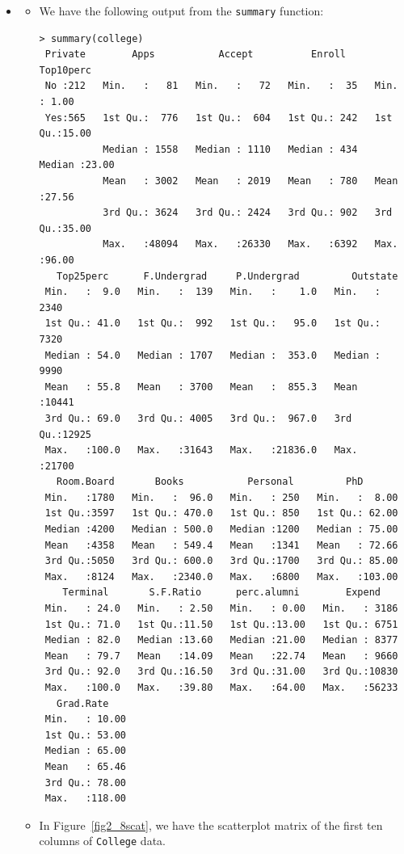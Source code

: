 \begin{itemize}
    \item[(c)]
        \begin{itemize}
            \item[i.] We have the following output from the \verb|summary| function:
                \begin{lstlisting}
> summary(college)
 Private        Apps           Accept          Enroll       Top10perc
 No :212   Min.   :   81   Min.   :   72   Min.   :  35   Min.   : 1.00
 Yes:565   1st Qu.:  776   1st Qu.:  604   1st Qu.: 242   1st Qu.:15.00
           Median : 1558   Median : 1110   Median : 434   Median :23.00
           Mean   : 3002   Mean   : 2019   Mean   : 780   Mean   :27.56
           3rd Qu.: 3624   3rd Qu.: 2424   3rd Qu.: 902   3rd Qu.:35.00
           Max.   :48094   Max.   :26330   Max.   :6392   Max.   :96.00
   Top25perc      F.Undergrad     P.Undergrad         Outstate
 Min.   :  9.0   Min.   :  139   Min.   :    1.0   Min.   : 2340
 1st Qu.: 41.0   1st Qu.:  992   1st Qu.:   95.0   1st Qu.: 7320
 Median : 54.0   Median : 1707   Median :  353.0   Median : 9990
 Mean   : 55.8   Mean   : 3700   Mean   :  855.3   Mean   :10441
 3rd Qu.: 69.0   3rd Qu.: 4005   3rd Qu.:  967.0   3rd Qu.:12925
 Max.   :100.0   Max.   :31643   Max.   :21836.0   Max.   :21700
   Room.Board       Books           Personal         PhD
 Min.   :1780   Min.   :  96.0   Min.   : 250   Min.   :  8.00
 1st Qu.:3597   1st Qu.: 470.0   1st Qu.: 850   1st Qu.: 62.00
 Median :4200   Median : 500.0   Median :1200   Median : 75.00
 Mean   :4358   Mean   : 549.4   Mean   :1341   Mean   : 72.66
 3rd Qu.:5050   3rd Qu.: 600.0   3rd Qu.:1700   3rd Qu.: 85.00
 Max.   :8124   Max.   :2340.0   Max.   :6800   Max.   :103.00
    Terminal       S.F.Ratio      perc.alumni        Expend
 Min.   : 24.0   Min.   : 2.50   Min.   : 0.00   Min.   : 3186
 1st Qu.: 71.0   1st Qu.:11.50   1st Qu.:13.00   1st Qu.: 6751
 Median : 82.0   Median :13.60   Median :21.00   Median : 8377
 Mean   : 79.7   Mean   :14.09   Mean   :22.74   Mean   : 9660
 3rd Qu.: 92.0   3rd Qu.:16.50   3rd Qu.:31.00   3rd Qu.:10830
 Max.   :100.0   Max.   :39.80   Max.   :64.00   Max.   :56233
   Grad.Rate
 Min.   : 10.00
 1st Qu.: 53.00
 Median : 65.00
 Mean   : 65.46
 3rd Qu.: 78.00
 Max.   :118.00
                \end{lstlisting}
            \item[ii.] In Figure~\ref{fig2_8scat}, we have the scatterplot
                matrix of the first
                ten columns of \verb|College| data.

\end{itemize}
\end{itemize}
